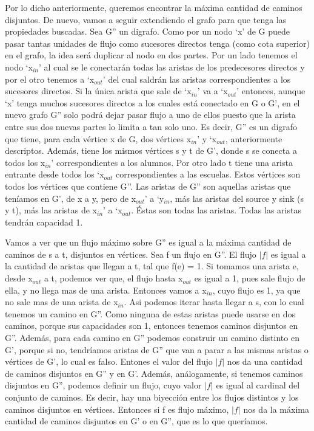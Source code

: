 Por lo dicho anteriormente, queremos encontrar la máxima cantidad de caminos disjuntos. De nuevo, vamos a seguir extendiendo el grafo para que tenga las 
propiedades buscadas. Sea G'' un digrafo.
Como por un nodo `x' de G puede pasar tantas unidades de flujo como sucesores directos tenga (como cota superior) en el grafo, la idea será duplicar al nodo en dos partes. Por un lado tenemos el nodo `x$_{in}$' al cual se le conectarán todas las aristas de los predecesores directos
 y por el otro tenemos a `x$_{out}$' del cual saldrán las aristas correspondientes a los sucesores directos. 
Si la única arista que sale de `x$_{in}$' va a `x$_{out}$' 
entonces, aunque `x' tenga muchos sucesores directos a los cuales está conectado en G o G', en el nuevo grafo G'' solo podrá dejar pasar flujo a uno de ellos puesto que la arista entre sus dos nuevas partes lo limita a tan solo uno.
Es decir, G'' es un digrafo que tiene, para cada vértice x de G, dos vértices x$_{in}$' y `x$_{out}$, anteriormente descriptos. Además, tiene los mismos vértices s y t de G', 
donde s se conecta a todos los x$_{in}$' correspondientes a los alumnos. Por otro lado t tiene una arista entrante desde todos los `x$_{out}$ correspondientes a las escuelas. 
Estos vértices son todos los vértices que contiene G''. 
Las aristas de G'' son aquellas aristas que teníamos en G', de x a y, pero de x$_{out}$' a `y$_{in}$, más las aristas del source y sink (s y t), más las aristas de x$_{in}$' a `x$_{out}$. Éstas son todas las aristas.
Todas las aristas tendrán capacidad 1.

\par{Vamos a ver que un flujo máximo sobre G'' es igual a la máxima cantidad de caminos de s a t, disjuntos en vértices.
Sea f un flujo en G''. El flujo $|f|$ es igual a la cantidad de aristas que llegan a t, tal que f(e) = 1. Si tomamos una arista e, desde x$_{out}$ a t, podemos ver que, el flujo
hasta x$_{out}$ es igual a 1, pues sale flujo de ella, y no llega mas de una arista. Entonces vamos a x$_{in}$, cuyo flujo es 1, ya que no sale mas de una arista de x$_{in}$.
Asi podemos iterar hasta llegar a s, con lo cual tenemos un camino en G''. Como ninguna de estas aristas puede usarse en dos caminos, porque sus capacidades son 1,
entonces tenemos caminos disjuntos en G''. Además, para cada camino en G'' podemos construir un camino distinto en G', porque si no, tendríamos aristas de G'' que van a parar a las mismas aristas o vértices de G', lo cual es falso. 
Entones el valor del flujo $|f|$ nos da una cantidad de caminos disjuntos en G'' y en G'. 
Además, análogamente, si tenemos caminos disjuntos en G'', podemos definir un flujo, cuyo valor $|f|$ es igual al cardinal del conjunto de caminos. Es decir, hay una biyección entre
los flujos distintos y los caminos disjuntos en vértices.
Entonces si f es flujo máximo, $|f|$ nos da la máxima cantidad de caminos disjuntos en G' o en G'', que es lo que queríamos. }

